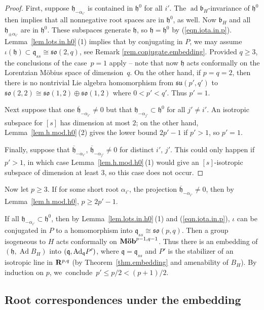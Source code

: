 \documentclass[10pt,a4paper]{amsart}
\numberwithin{equation}{section}
\theoremstyle{definition}
\newcommand{\BR}{{\bf R}}
\newcommand{\lieh}{\mathfrak{h}}
\def\q{{\mathfrak q}}
\def\b{{\mathfrak b}}
\newcommand{\so}{\mathfrak{so}}
\newcommand{\Ad}{\operatorname{Ad}}
\newcommand{\ad}{\operatorname{ad}}
\begin{document}
\begin{proof}
First, suppose $\lieh_{- \alpha_{i'}}$ is contained in $\lieh^0$ for all $i'$. The $\ad \b_H$-invariance of $\lieh^0$ then implies that all nonnegative root spaces are in $\lieh^0$, as well. Now $\b_H$ and all $\lieh_{\pm \alpha_{i'}}$ are in $\lieh^0$. These subspaces generate $\lieh$, so $\lieh = \lieh^0$ by (\ref{eqn.iota.in.p}). Lemma~\ref{lem.lots.in.h0}\,(1) implies that by conjugating in $P$, we may assume $\iota(\lieh) \subset \q_{ss} \cong \so(2,q)$, see Remark \ref{rem.conjugate.embedding}. Provided $q \geq 3$, the conclusions of the case~${p=1}$ apply -- note that now $\lieh$ acts conformally on the Lorentzian M\"obius space of dimension~$q$. On the other hand, if $p=q=2$, then there is no nontrivial Lie algebra homomorphism from $\mathfrak{su}(p',q')$ to $\so(2,2) \cong \so(1,2) \oplus \so(1,2)$ where $0 < p' < q'$.
Thus $p'=1$.

Next suppose that one $\overline{\lieh}_{- \alpha_{i'}} \neq 0$ but that $\lieh_{- \alpha_{j'}} \subset \lieh^0$ for all $j' \neq i'$. An isotropic subspace for $[s]$ has dimension at most $2$; on the other hand, Lemma~\ref{lem.h.mod.h0}\,(2) gives the lower bound $2p'-1$ if $p' >1$, so $p'=1$.

Finally, suppose that $\overline{\lieh}_{- \alpha_{i'}}$, $\overline{\lieh}_{- \alpha_{j'}} \neq 0$ for distinct $i'$, $j'$. This could only happen if $p'>1$, in which case Lemma~\ref{lem.h.mod.h0}\,(1) would give an $[s]$-isotropic subspace of dimension at least $3$, so this case does not occur.
\end{proof}

Now let $p \geq 3$.
If for some short root $\alpha_{i'}$, the projection $\overline{\lieh}_{- \alpha_{i'}} \neq 0$, then by Lemma~\ref{lem.h.mod.h0}, $p \geq 2p'-1$.

If all $\lieh_{- \alpha_{i'}} \subset \lieh^0$, then by Lemma~\ref{lem.lots.in.h0}\,(1) and (\ref{eqn.iota.in.p}), $\iota$ can be conjugated in $P$ to a homomorphism into $\q_{ss} \cong \so(p,q)$. Then a group isogeneous to $H$ acts conformally on $\mbox{\bf M\"ob}^{p-1,q-1}$.
Thus there is an embedding of $(\lieh, \Ad B_H)$ into $(\q, {\rm Ad}_\q P')$, where $\q = \q_{ss}$ and $P'$ is the stabilizer of an isotropic line in $\BR^{p,q}$ (by Theorem~\ref{thm.embedding} and amenability of $B_H$).
By induction on $p$, we~conclude~${p' \leq p/2 < (p+1)/2}$.


\subsection{Root correspondences under the embedding}
\label{subsec.root.correspondences}
\end{document}
